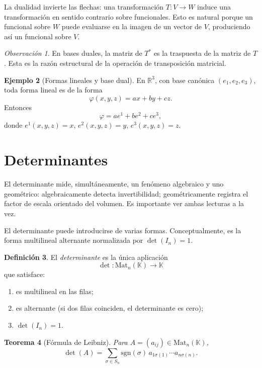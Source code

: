 \documentclass[10pt,a4paper,oneside]{article}
\theoremstyle{plain}
\newtheorem{theorem}{Teorema}[section]
\theoremstyle{definition}
\newtheorem{definition}[theorem]{Definición}
\newtheorem{example}[theorem]{Ejemplo}
\theoremstyle{remark}
\newtheorem{remark}[theorem]{Observación}
\newcommand{\K}{\mathbb{K}}
\newcommand{\R}{\mathbb{R}}
\newcommand{\Mat}{\mathrm{Mat}}
\begin{document}
\begin{intuitionBox}
La dualidad invierte las flechas: una transformación \(T:V\to W\) induce una transformación en sentido contrario sobre funcionales. Esto es natural porque un funcional sobre \(W\) puede evaluarse en la imagen de un vector de \(V\), produciendo así un funcional sobre \(V\).
\end{intuitionBox}

\begin{remark}
En bases duales, la matriz de \(T^*\) es la traspuesta de la matriz de \(T\). Esta es la razón estructural de la operación de transposición matricial.
\end{remark}

\begin{example}[Formas lineales y base dual]
En \(\R^3\), con base canónica \((e_1,e_2,e_3)\), toda forma lineal es de la forma
\[
\varphi(x,y,z)=ax+by+cz.
\]
Entonces
\[
\varphi=a e^1+b e^2+c e^3,
\]
donde \(e^1(x,y,z)=x\), \(e^2(x,y,z)=y\), \(e^3(x,y,z)=z\).
\end{example}

\section{Determinantes}
\begin{summaryBox}
El determinante mide, simultáneamente, un fenómeno algebraico y uno geométrico: algebraicamente detecta invertibilidad; geométricamente registra el factor de escala orientado del volumen. Es importante ver ambas lecturas a la vez.
\end{summaryBox}
El determinante puede introducirse de varias formas. Conceptualmente, es la forma multilineal alternante normalizada por \(\det(I_n)=1\).

\begin{definition}
El \emph{determinante} es la única aplicación
\[
\det:\Mat_n(\K)\to\K
\]
que satisface:
\begin{enumerate}[label=\textup{(\roman*)}]
\item es multilineal en las filas;
\item es alternante (si dos filas coinciden, el determinante es cero);
\item \(\det(I_n)=1\).
\end{enumerate}
\end{definition}

\begin{theorem}[Fórmula de Leibniz]
Para \(A=(a_{ij})\in\Mat_n(\K)\),
\[
\det(A)=\sum_{\sigma\in S_n}\mathrm{sgn}(\sigma)
\,a_{1\sigma(1)}\cdots a_{n\sigma(n)}.
\]
\end{theorem}
\end{document}
